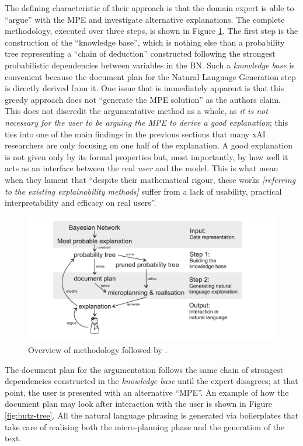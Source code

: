 The defining characteristic of their approach is that the domain expert is able to \enquote{argue} with the MPE and investigate alternative explanations.
The complete methodology, executed over three steps, is shown in Figure \ref{fig:butz-methodology}.
The first step is the construction of the \enquote{knowledge base}, which is nothing else than a probability tree representing a \enquote{chain of deduction} constructed following the strongest probabilistic dependencies between variables in the BN.
Such a \textit{knowledge base} is convenient because the document plan for the Natural Language Generation step is directly derived from it.
One issue that is immediately apparent is that this greedy approach does not \enquote{generate the MPE solution} as the authors claim.
This does not discredit the argumentative method as a whole, as \textit{it is not necessary for the user to be arguing the MPE to derive a good explanation}; this ties into one of the main findings in the previous sections that many xAI researchers are only focusing on one half of the explanation.
A good explanation is not given only by its formal properties but, most importantly, by how well it acts as an interface between the real \textit{user} and the model.
This is what \citet{abdul2018trends} mean when they lament that \enquote{despite their mathematical rigour, these works \textit{[referring to the existing explainability methods]} suffer from a lack of usability, practical interpretability and efficacy on real users}.

\begin{figure}[htbp]
\centerline{\includegraphics[width=\textwidth]{literature-review/images/butz-methodology}}
\caption{Overview of methodology followed by \citet{Butz2018}.}
\label{fig:butz-methodology}
\end{figure}

The document plan for the argumentation follows the same chain of strongest dependencies constructed in the \textit{knowledge base} until the expert disagrees; at that point, the user is presented with an alternative \enquote{MPE}.
An example of how the document plan may look after interaction with the user is shown in Figure \ref{fig:butz-tree}.
All the natural language phrasing is generated via boilerplates that take care of realising both the micro-planning phase and the generation of the text.

